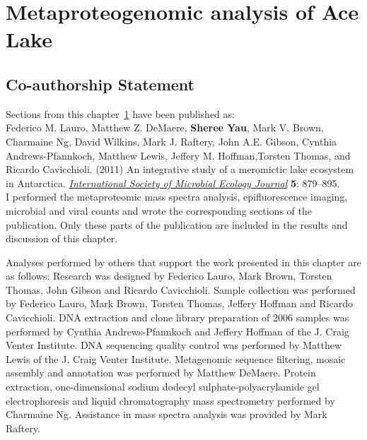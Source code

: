 \chapter{Metaproteogenomic analysis of Ace Lake}
\label{ch:ace}

\section*{Co-authorship Statement}

Sections from this chapter~\ref{ch:ace} have been published as:\\

Federico M. Lauro, Matthew Z. DeMaere, \textbf{Sheree Yau}, Mark V. Brown, Charmaine Ng,
David Wilkins, Mark J. Raftery, John A.E. Gibson, Cynthia Andrews-Pfannkoch, Matthew Lewis,
Jeffery M. Hoffman,Torsten Thomas, and Ricardo Cavicchioli. (2011)
An integrative study of a meromictic lake ecosystem in Antarctica.
\emph{\underline{International Society of Microbial Ecology Journal}}
\textbf{5}: 879--895.\\

I performed the metaproteomic mass spectra analysis, epifluorescence imaging,
microbial and viral counts and wrote the corresponding sections of the publication.
Only these parts of the publication are included in the results and discussion of this chapter.

Analyses performed by others that support the work presented in this chapter are as follows:
Research was designed by Federico Lauro, Mark Brown, Torsten Thomas, John Gibson and Ricardo Cavicchioli.
Sample collection was performed by Federico Lauro, Mark Brown, Torsten Thomas, Jeffery Hoffman and Ricardo Cavicchioli.
DNA extraction and clone library preparation of 2006 samples was performed by Cynthia Andrews-Pfannkoch and Jeffery Hoffman of the J. Craig Venter Institute.
DNA sequencing quality control was performed by Matthew Lewis of the J. Craig Venter Institute.
Metagenomic sequence filtering, mosaic assembly and annotation was performed by Matthew DeMaere.
Protein extraction, one-dimensional sodium dodecyl sulphate-polyacrylamide gel electrophoresis and liquid chromatography mass spectrometry performed by Charmaine Ng.
Assistance in mass spectra analysis was provided by Mark Raftery.
\newpage


